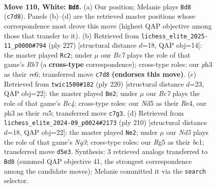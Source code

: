 \documentclass[11pt]{article}
\begin{document}
\clearpage

\begin{figure}[p]\centering
\begin{subfigure}{0.46\textwidth}\centering
\resizebox{\linewidth}{!}{%
\newchessgame
\chessboard[
  setfen={8/1kB5/8/3N2R1/1K6/7p/8/8 w - - 0 110},
  showmover=false,
  pgfstyle=straightmove, color=movearrow, markmove={c7-d8}
]}
\caption{}
\end{subfigure}\hfill
\begin{subfigure}{0.46\textwidth}\centering
\resizebox{\linewidth}{!}{%
\newchessgame
\chessboard[
  setfen={8/8/4R3/8/5k2/3n4/1r6/K7 b - - 59 114},
  showmover=false,
  pgfstyle=straightmove, color=movearrow, markmove={b2-c2}
]}
\caption{}
\end{subfigure}
\\[4pt]
\begin{subfigure}{0.46\textwidth}\centering
\resizebox{\linewidth}{!}{%
\newchessgame
\chessboard[
  setfen={8/8/8/r7/2B1RK2/2k5/8/8 w - - 79 111},
  showmover=false,
  pgfstyle=straightmove, color=movearrow, markmove={c4-e2}
]}
\caption{}
\end{subfigure}\hfill
\begin{subfigure}{0.46\textwidth}\centering
\resizebox{\linewidth}{!}{%
\newchessgame
\chessboard[
  setfen={8/5p2/8/5Bk1/4K3/6N1/8/2b5 w - - 3 106},
  showmover=false,
  pgfstyle=straightmove, color=movearrow, markmove={g3-e2}
]}
\caption{}
\end{subfigure}
\caption{\textbf{Move 110, White: \texttt{Bd8}.} (a) Our position; Melanie plays \texttt{Bd8} (\texttt{c7d8}). Panels (b)--(d) are the retrieved master positions whose correspondence most drove this move (highest QAP objective among those that transfer to it). (b) Retrieved from \texttt{lichess\_elite\_2025-11\_p0000\#794} (ply 227) [structural distance $d$=18, QAP obj=14]: the master played \texttt{Rc2}; under $\mu$ our \emph{Bc7} plays the role of that game's \emph{Rb7} (a \textbf{cross-type} correspondence); cross-type roles: our \emph{p}h3 as their \emph{r}e6; transferred move \texttt{c7d8} \textbf{(endorses this move)}. (c) Retrieved from \texttt{twic1500\#182} (ply 220) [structural distance $d$=23, QAP obj=22]: the master played \texttt{Be2}; under $\mu$ our \emph{Bc7} plays the role of that game's \emph{Bc4}; cross-type roles: our \emph{N}d5 as their \emph{R}e4, our \emph{p}h3 as their \emph{r}a5; transferred move \texttt{c7g3}. (d) Retrieved from \texttt{lichess\_elite\_2024-09\_p0024\#2173} (ply 210) [structural distance $d$=18, QAP obj=22]: the master played \texttt{Ne2}; under $\mu$ our \emph{Nd5} plays the role of that game's \emph{Ng3}; cross-type roles: our \emph{R}g5 as their \emph{b}c1; transferred move \texttt{d5e3}. Synthesis: 3 retrieved analogs transferred to \texttt{Bd8} (summed QAP objective 41, the strongest correspondence among the candidate moves); Melanie committed it via the \texttt{search} selector.}
\label{fig:thought-m218}
\end{figure}
\end{document}
